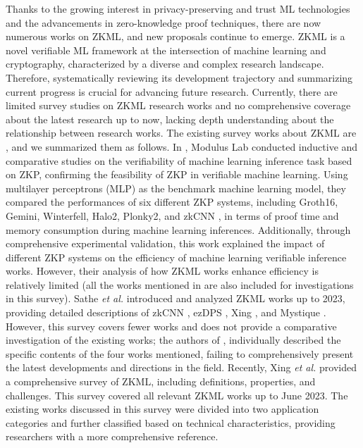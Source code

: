 \documentclass[journal]{IEEEtran}
\begin{document}
Thanks to the growing interest in privacy-preserving and trust ML technologies and the advancements in zero-knowledge proof techniques, there are now numerous works on ZKML, and new proposals continue to emerge. ZKML is a novel verifiable ML framework at the intersection of machine learning and cryptography, characterized by a diverse and complex research landscape. Therefore, systematically reviewing its development trajectory and summarizing current progress is crucial for advancing future research. Currently, there are limited survey studies on ZKML research works and no comprehensive coverage about the latest research up to now, lacking depth understanding about the relationship between research works. The existing survey works about ZKML are \cite{moduluslabs2023cost,sathe2023state,xing2023zero}, and we summarized them as follows. In \cite{moduluslabs2023cost}, Modulus Lab conducted inductive and comparative studies on the verifiability of machine learning inference task based on ZKP, confirming the feasibility of ZKP in verifiable machine learning. Using multilayer perceptrons (MLP) as the benchmark machine learning model, they compared the performances of six different ZKP systems, including Groth16, Gemini, Winterfell, Halo2, Plonky2, and zkCNN \cite{liu2021zkcnn}, in terms of proof time and memory consumption during machine learning inferences. Additionally, through comprehensive experimental validation, this work explained the impact of different ZKP systems on the efficiency of machine learning verifiable inference works. However, their analysis of how ZKML works enhance efficiency is relatively limited (all the works mentioned in \cite{moduluslabs2023cost} are also included for investigations in this survey). Sathe \emph{et al.} \cite{sathe2023state} introduced and analyzed ZKML works up to 2023, providing detailed descriptions of zkCNN \cite{liu2021zkcnn}, ezDPS \cite{wang2022ezdps}, Xing \cite{xing2023block}, and Mystique \cite{weng2021mystique}. However, this survey covers fewer works and does not provide a comparative investigation of the existing works; the authors of \cite{sathe2023state}, individually described the specific contents of the four works mentioned, failing to comprehensively present the latest developments and directions in the field. Recently, Xing \emph{et al.} \cite{xing2023zero} provided a comprehensive survey of ZKML, including definitions, properties, and challenges. This survey covered all relevant ZKML works up to June 2023. The existing works discussed in this survey were divided into two application categories and further classified based on technical characteristics, providing researchers with a more comprehensive reference.
\end{document}
